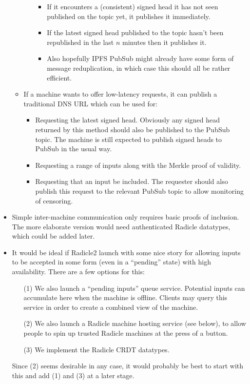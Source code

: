 \documentclass[a4paper, oneside, 10pt]{amsart}
\begin{document}
\begin{itemize}
\begin{itemize}
\begin{itemize}
      \begin{itemize}
      \item
        If it encounters a (consistent) signed head it has not seen published on
        the topic yet, it publishes it immediately.
      \item
        If the latest signed head published to the topic hasn't been republished
        in the last $n$ minutes then it publishes it.
      \item
        Also hopefully IPFS PubSub might already have some form of message
        reduplication, in which case this should all be rather efficient.
      \end{itemize}
    \end{itemize}
  \item
    If a machine wants to offer low-latency requests, it can publish a
    traditional DNS URL which can be used for:
    \begin{itemize}
    \item
      Requesting the latest signed head. Obviously any signed head returned by
      this method should also be published to the PubSub topic. The machine is
      still expected to publish signed heads to PubSub in the usual way.
    \item
      Requesting a range of inputs along with the Merkle proof of validity.
    \item
      Requesting that an input be included. The requester should also publish
      this request to the relevant PubSub topic to allow monitoring of
      censoring.
    \end{itemize}
  \end{itemize}
\item
  Simple inter-machine communication only requires basic proofs of
  inclusion. The more elaborate version would need authenticated Radicle
  datatypes, which could be added later.
\item
  It would be ideal if Radicle2 launch with some nice story for allowing inputs
  to be accepted in some form (even in a ``pending'' state) with high
  availability. There are a few options for this:
  \begin{itemize}
  \item[(1)] We also launch a ``pending inputs'' queue service. Potential inputs
    can accumulate here when the machine is offline. Clients may query this
    service in order to create a combined view of the machine.
  \item[(2)] We also launch a Radicle machine hosting service (see below), to
    allow people to spin up trusted Radicle machines at the press of a button.
  \item[(3)] We implement the Radicle CRDT datatypes.
  \end{itemize}
  Since (2) seems desirable in any case, it would probably be best to start with
  this and add (1) and (3) at a later stage.


\end{itemize}
\end{document}
